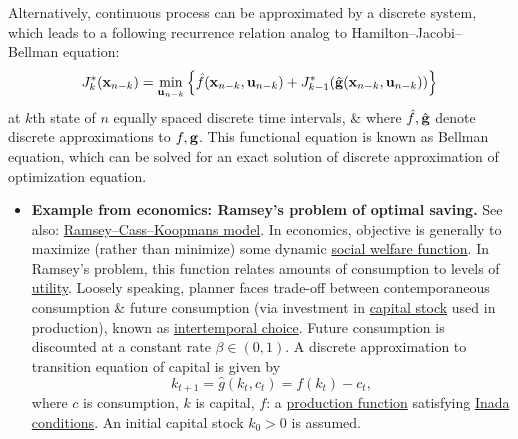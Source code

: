 \documentclass{article}
\begin{document}
\begin{enumerate}
	Alternatively, continuous process can be approximated by a discrete system, which leads to a following recurrence relation analog to Hamilton--Jacobi--Bellman equation:
	\begin{equation*}
		J_k^*({\bf x}_{n-k}) = \min_{{\bf u}_{n-k}} \left\{\hat{f}({\bf x}_{n-k},{\bf u}_{n-k}) + J_{k-1}^*(\hat{\bf g}({\bf x}_{n-k},{\bf u}_{n-k}))\right\}
	\end{equation*}
	at $k$th state of $n$ equally spaced discrete time intervals, \& where $\hat{f},\hat{\bf g}$ denote discrete approximations to $f,{\bf g}$. This functional equation is known as Bellman equation, which can be solved for an exact solution of discrete approximation of optimization equation.
	\begin{itemize}
		\item {\bf Example from economics: Ramsey's problem of optimal saving.} See also: \href{https://en.wikipedia.org/wiki/Ramsey%E2%80%93Cass%E2%80%93Koopmans_model}{Ramsey--Cass--Koopmans model}. In economics, objective is generally to maximize (rather than minimize) some dynamic \href{https://en.wikipedia.org/wiki/Social_welfare_function}{social welfare function}. In Ramsey's problem, this function relates amounts of consumption to levels of \href{https://en.wikipedia.org/wiki/Utility}{utility}. Loosely speaking, planner faces trade-off between contemporaneous consumption \& future consumption (via investment in \href{https://en.wikipedia.org/wiki/Physical_capital}{capital stock} used in production), known as \href{https://en.wikipedia.org/wiki/Intertemporal_choice}{intertemporal choice}. Future consumption is discounted at a constant rate $\beta\in(0,1)$. A discrete approximation to transition equation of capital is given by
		\begin{equation*}
			k_{t+1} = \hat{g}(k_t,c_t) = f(k_t) - c_t,
		\end{equation*}
		where $c$ is consumption, $k$ is capital, $f$: a \href{https://en.wikipedia.org/wiki/Production_function}{production function} satisfying \href{https://en.wikipedia.org/wiki/Inada_conditions}{Inada conditions}. An initial capital stock $k_0 > 0$ is assumed.


\end{itemize}
\end{enumerate}
\end{document}
